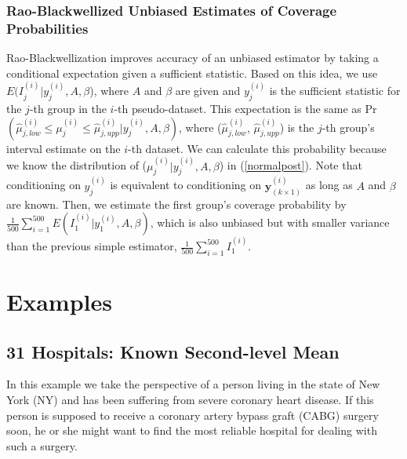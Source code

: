 \documentclass[article]{jss}
\begin{document}
\subsubsection{Rao-Blackwellized Unbiased Estimates of Coverage Probabilities}
Rao-Blackwellization improves accuracy of an unbiased estimator by taking a conditional expectation given a sufficient statistic. Based on this idea, we use $E(I^{(i)}_{j}\vert y^{(i)}_{j}, A, \beta$), where $A$ and $\beta$ are given and $y^{(i)}_{j}$ is the sufficient statistic for the $j$-th group in the $i$-th pseudo-dataset. This expectation is the same as Pr$(\hat{\mu}^{(i)}_{j, low}\le \mu^{(i)}_{j} \le\hat{\mu}^{(i)}_{j, upp}\vert y^{(i)}_{j}, A, \beta)$, where ($\hat{\mu}^{(i)}_{j, low}$, $\hat{\mu}^{(i)}_{j, upp}$) is the $j$-th group's interval estimate on the $i$-th dataset. We can calculate this probability  because we know the distribution of ($\mu^{(i)}_{j} \vert y^{(i)}_{j}, A, \beta$) in (\ref{normalpost}). Note that conditioning on $y^{(i)}_{j}$ is equivalent to conditioning on $\mathbf{y}^{(i)}_{(k\times1)}$ as long as $A$ and $\beta$ are known. Then, we estimate the first group's coverage probability by $\frac{1}{500}\sum_{i=1}^{500}E(I^{(i)}_{1}\vert y^{(i)}_{1}, A, \beta)$, which is also unbiased but with smaller variance than the previous simple estimator, $\frac{1}{500}\sum_{i=1}^{500}I^{(i)}_{1}$.



\section[Examples]{Examples}
\subsection[Known Second-level Mean]{31 Hospitals: Known Second-level Mean}
\label{sec:ex:hosp}
In this example we take the perspective of a person living in the state of New York (NY) and has been suffering from severe coronary heart disease. If this person is supposed to receive a coronary artery bypass graft (CABG) surgery soon, he or she might want to find the most reliable hospital for dealing with such a surgery.
\end{document}
